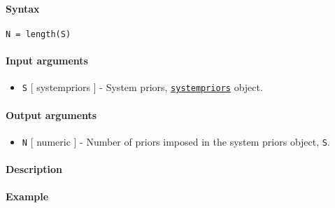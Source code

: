 


	\paragraph{Syntax}

\begin{verbatim}
N = length(S)
\end{verbatim}

\paragraph{Input arguments}

\begin{itemize}
\itemsep1pt\parskip0pt
\item
  \texttt{S} {[} systempriors {]} - System priors,
  \href{systempriors/Contents}{\texttt{systempriors}} object.
\end{itemize}

\paragraph{Output arguments}

\begin{itemize}
\itemsep1pt\parskip0pt
\item
  \texttt{N} {[} numeric {]} - Number of priors imposed in the system
  priors object, \texttt{S}.
\end{itemize}

\paragraph{Description}

\paragraph{Example}


